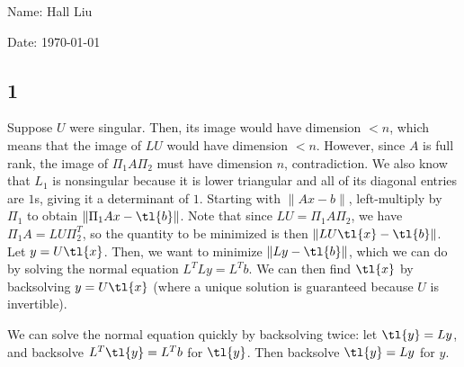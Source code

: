\documentclass{article}
\begin{document}
Name: Hall Liu

Date: \today 
\vspace{1.5cm}
\subsection*{1}
Suppose $U$ were singular. Then, its image would have dimension $<n$, which means that the image of $LU$ would have dimension $<n$. However, since $A$ is full rank, the image of $\Pi_1A\Pi_2$ must have dimension $n$, contradiction. We also know that $L_1$ is nonsingular because it is lower triangular and all of its diagonal entries are $1$s, giving it a determinant of $1$.
Starting with $\|Ax-b\|$, left-multiply by $\Pi_1$ to obtain $\|\Pi_1Ax-\tl{b}\|$. Note that since $LU=\Pi_1A\Pi_2$, we have $\Pi_1A=LU\Pi_2^T$, so the quantity to be minimized is then $\|LU\tl{x}-\tl{b}\|$. Let $y=U\tl{x}$. Then, we want to minimize $\|Ly-\tl{b}\|$, which we can do by solving the normal equation $L^TLy=L^Tb$. We can then find $\tl{x}$ by backsolving $y=U\tl{x}$ (where a unique solution is guaranteed because $U$ is invertible).

We can solve the normal equation quickly by backsolving twice: let $\tl{y}=Ly$, and backsolve $L^T\tl{y}=L^Tb$ for $\tl{y}$. Then backsolve $\tl{y}=Ly$ for $y$.
\end{document}
